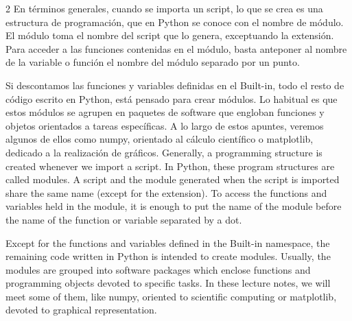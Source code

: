 \begin{paracol}{2}
En términos generales, cuando se importa un script, lo que se crea es una estructura de programación, que en Python se conoce con el nombre de módulo. El módulo toma el nombre del script que lo genera, exceptuando la extensión. Para acceder a las funciones contenidas en el módulo, basta anteponer al nombre de la variable o función el nombre del módulo separado por un punto.

Si descontamos las funciones y variables definidas en el Built-in, todo el resto de código escrito en Python, está pensado para crear módulos. Lo habitual es que estos módulos se agrupen en paquetes de software que engloban funciones y objetos orientados a tareas específicas. A lo largo de estos apuntes, veremos algunos de ellos como numpy, orientado al cálculo científico o matplotlib, dedicado a la realización de gráficos.
\switchcolumn
Generally, a programming structure is created whenever we import a script. In Python, these program structures are called modules. A  script and the module generated when the script is imported share the same name (except for the extension). To access the functions and 
variables held in the module, it is enough to put the name of the module before the name of the function or variable separated by a dot.

Except for the functions and variables defined in the Built-in namespace, the remaining code written in Python is intended to create modules. Usually, the modules are grouped into software packages which enclose functions and programming objects devoted to specific tasks. In these lecture notes, we will meet some of them, like numpy, oriented to scientific computing or matplotlib, devoted to graphical representation.    
\end{paracol}

